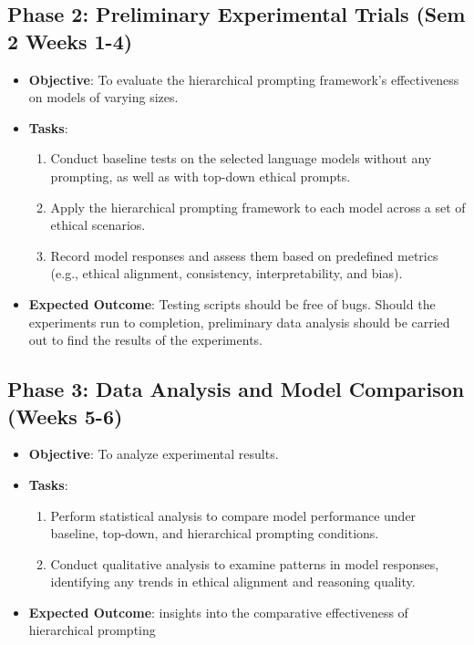 \documentclass{article}
\begin{document}
\subsection{Phase 2: Preliminary Experimental Trials (Sem 2 Weeks 1-4)}

\begin{itemize}
    \item \textbf{Objective}: To evaluate the hierarchical prompting framework's effectiveness on models of varying sizes.
    \item \textbf{Tasks}:
        \begin{enumerate}
            \item Conduct baseline tests on the selected language models without any prompting, as well as with top-down ethical prompts.
            \item Apply the hierarchical prompting framework to each model across a set of ethical scenarios. 
            \item Record model responses and assess them based on predefined metrics (e.g., ethical alignment, consistency, interpretability, and bias).
        \end{enumerate}
    \item \textbf{Expected Outcome}: Testing scripts should be free of bugs. 
    Should the experiments run to completion, preliminary data analysis should be carried out to find the results of the experiments.
\end{itemize}

\subsection{Phase 3: Data Analysis and Model Comparison (Weeks 5-6)}

\begin{itemize}
    \item \textbf{Objective}: To analyze experimental results.
    \item \textbf{Tasks}:
        \begin{enumerate}
            \item Perform statistical analysis to compare model performance under baseline, top-down, and hierarchical prompting conditions.
            \item Conduct qualitative analysis to examine patterns in model responses, identifying any trends in ethical alignment and reasoning quality.
        \end{enumerate}
    \item \textbf{Expected Outcome}: insights into the comparative effectiveness of hierarchical prompting
\end{itemize}
\end{document}
